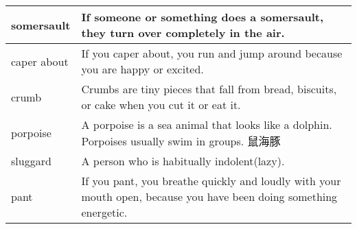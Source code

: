 \documentclass{article}
\begin{document}
\begin{center}
\begin{longtable}{|l|p{9cm}|}
\hline
somersault
&
If someone or something does a somersault, they turn over completely in the air.
\\

\hline
caper about
&
If you caper about, you run and jump around because you are happy or excited.
\\

\hline
crumb
&
Crumbs are tiny pieces that fall from bread, biscuits, or cake when you cut it or eat it.
\\

\hline
porpoise
&
A porpoise is a sea animal that looks like a dolphin. Porpoises usually swim in groups. 鼠海豚
\\

\hline
sluggard
&
A person who is habitually indolent(lazy).
\\

\hline
pant
&
If you pant, you breathe quickly and loudly with your mouth open, because you have been doing something energetic.
\\

\hline

\end{longtable}
\end{center}
\end{document}
